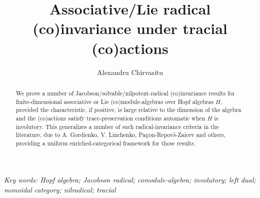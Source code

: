 \documentclass[11pt,leqno]{article}
\title{Associative/Lie radical (co)invariance under tracial (co)actions}
\author{Alexandru Chirvasitu}
\theoremstyle{plain}
\theoremstyle{plain}
\theoremstyle{plain}
\numberwithin{equation}{section}
\theoremstyle{nonumberplain}
\newcommand\1{{\bf 1}}
\begin{document}
\date{}


\newcommand{\Addresses}{{%
  \bigskip
  \footnotesize

  \textsc{Department of Mathematics, University at Buffalo}
  \par\nopagebreak
  \textsc{Buffalo, NY 14260-2900, USA}  
  \par\nopagebreak
  \textit{E-mail address}: \texttt{achirvas@buffalo.edu}


}}


\maketitle

\begin{abstract}
  We prove a number of Jacobson/solvable/nilpotent-radical (co)invariance results for finite-dimensional associative or Lie (co)module-algebras over Hopf algebras $H$, provided the characteristic, if positive, is large relative to the dimension of the algebra and the (co)actions satisfy trace-preservation conditions automatic when $H$ is involutory. This generalizes a number of such radical-invariance criteria in the literature, due to A. Gordienko, V. Linchenko, Pagon-Repov{\v{s}}-Zaicev and others, providing a uniform enriched-categorical framework for those results.
\end{abstract}

\noindent \emph{Key words:
  Hopf algebra;
  Jacobson radical;
  comodule-algebra;
  involutory;
  left dual;  
  monoidal category;
  nilradical;
  tracial
}

\vspace{.5cm}


\end{document}
